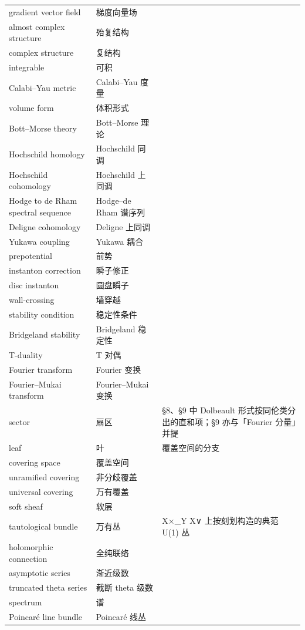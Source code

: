 \begin{longtable}{@{}p{}p{}p{}@{}}
gradient vector field & 梯度向量场 &  \\
almost complex structure & 殆复结构 &  \\
complex structure & 复结构 &  \\
integrable & 可积 &  \\
Calabi–Yau metric & Calabi–Yau 度量 &  \\
volume form & 体积形式 &  \\
Bott–Morse theory & Bott–Morse 理论 &  \\
Hochschild homology & Hochschild 同调 &  \\
Hochschild cohomology & Hochschild 上同调 &  \\
Hodge to de Rham spectral sequence & Hodge–de Rham 谱序列 &  \\
Deligne cohomology & Deligne 上同调 &  \\
Yukawa coupling & Yukawa 耦合 &  \\
prepotential & 前势 &  \\
instanton correction & 瞬子修正 &  \\
disc instanton & 圆盘瞬子 &  \\
wall-crossing & 墙穿越 &  \\
stability condition & 稳定性条件 &  \\
Bridgeland stability & Bridgeland 稳定性 &  \\
T-duality & T 对偶 &  \\
Fourier transform & Fourier 变换 &  \\
Fourier–Mukai transform & Fourier–Mukai 变换 &  \\
sector & 扇区 & §8、§9 中 Dolbeault 形式按同伦类分出的直和项；§9 亦与「Fourier 分量」并提 \\
leaf & 叶 & 覆盖空间的分支 \\
covering space & 覆盖空间 &  \\
unramified covering & 非分歧覆盖 &  \\
universal covering & 万有覆盖 &  \\
soft sheaf & 软层 &  \\
tautological bundle & 万有丛 & X×\_Y X∨ 上按刻划构造的典范 U(1) 丛 \\
holomorphic connection & 全纯联络 &  \\
asymptotic series & 渐近级数 &  \\
truncated theta series & 截断 theta 级数 &  \\
spectrum & 谱 &  \\
Poincaré line bundle & Poincaré 线丛 &  \\

\end{longtable}
